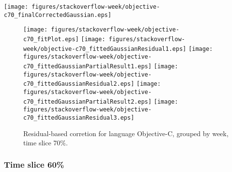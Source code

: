 \begin{center}
{\texttt{[image: figures/stackoverflow-week/objective-c70\_finalCorrectedGaussian.eps]}}
\end{center}

\FloatBarrier

\begin{figure}[t]
\centering
{}
{\texttt{[image: figures/stackoverflow-week/objective-c70\_fitPlot.eps]}}
{\texttt{[image: figures/stackoverflow-week/objective-c70\_fittedGaussianResidual1.eps]}}
{\texttt{[image: figures/stackoverflow-week/objective-c70\_fittedGaussianPartialResult1.eps]}}
{\texttt{[image: figures/stackoverflow-week/objective-c70\_fittedGaussianResidual2.eps]}}
{\texttt{[image: figures/stackoverflow-week/objective-c70\_fittedGaussianPartialResult2.eps]}}
{\texttt{[image: figures/stackoverflow-week/objective-c70\_fittedGaussianResidual3.eps]}}
\caption{Residual-based corretion for language Objective-C, grouped by week, time slice 70\%.}
\end{figure}


\FloatBarrier


\subsubsection{Time slice 60\%}

